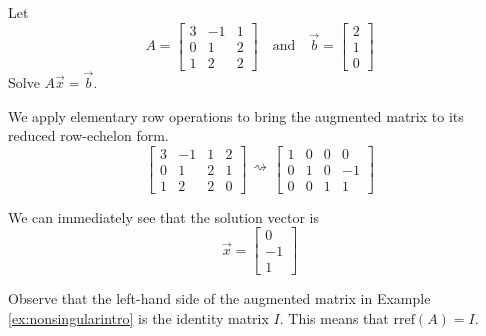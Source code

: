 \documentclass{ximera}
\begin{document}
\begin{example}\label{ex:nonsingularintro}
Let $$A=\begin{bmatrix}3&-1&1\\0&1&2\\1&2&2\end{bmatrix}\quad\text{and}\quad\vec{b}=\begin{bmatrix}2\\1\\0\end{bmatrix}$$
Solve $A\vec{x}=\vec{b}$.
\begin{explanation}
 We apply elementary row operations to bring the augmented matrix to its reduced row-echelon form.
 $$\left[\begin{array}{ccc|c}  
 3&-1&1&2\\0&1&2&1\\1&2&2&0
 \end{array}\right]\begin{array}{c}
 \\
 \rightsquigarrow\\
 \\
 \end{array}\left[\begin{array}{ccc|c}  
 1&0&0&0\\0&1&0&-1\\0&0&1&1
 \end{array}\right]$$
 
 We can immediately see that the solution vector is
 $$\vec{x}=\begin{bmatrix}0\\-1\\1\end{bmatrix}$$
 \end{explanation}
\end{example}



Observe that the left-hand side of the augmented matrix in Example \ref{ex:nonsingularintro} is the identity matrix $I$.  This means that $\mbox{rref}(A)=I$.  
\end{document}
